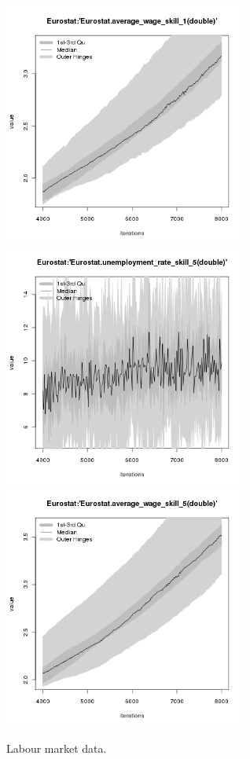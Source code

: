 \begin{figure}[H!]
\begin{minipage}{17cm}
\includegraphics[width=8cm]{./png/tax_0.05/Eurostat-average_wage_skill_1.png}\\
\includegraphics[width=8cm]{./png/tax_0.05/Eurostat-unemployment_rate_skill_5.png}
\includegraphics[width=8cm]{./png/tax_0.05/Eurostat-average_wage_skill_5.png}
\end{minipage}
\caption{Labour market data.}
\label{Figure: Labour Market}
\end{figure}


